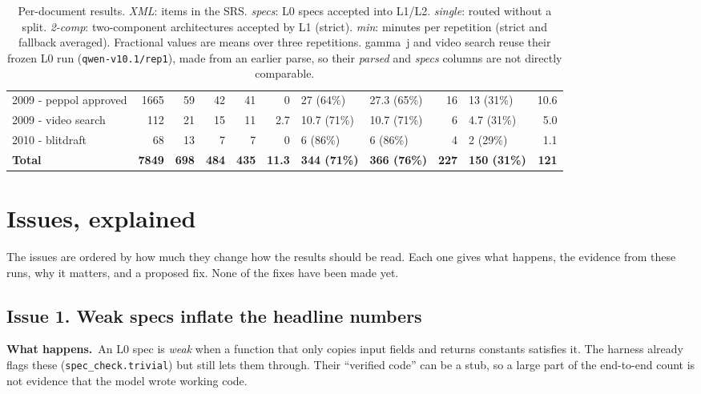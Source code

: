 \documentclass[10pt,a4paper]{article}
\newcommand{\code}[1]{\texttt{\small #1}}
\newcommand{\what}{\par\smallskip\textbf{What happens.}~}
\begin{document}
\begin{table}[h]
\begin{tabular}{@{}lrrrrrllrlr@{}}
2009 - peppol approved & 1665 & 59  & 42 & 41 & 0   & 27 (64\%)    & 27.3 (65\%)  & 16 & 13 (31\%)   & 10.6 \\
2009 - video search    & 112  & 21  & 15 & 11 & 2.7 & 10.7 (71\%)  & 10.7 (71\%)  & 6  & 4.7 (31\%)  & 5.0 \\
2010 - blitdraft       & 68   & 13  & 7  & 7  & 0   & 6 (86\%)     & 6 (86\%)     & 4  & 2 (29\%)    & 1.1 \\
\midrule
\rowcolor{white}
\textbf{Total} & \textbf{7849} & \textbf{698} & \textbf{484} & \textbf{435} & \textbf{11.3} & \textbf{344 (71\%)} &
  \textbf{366 (76\%)} & \textbf{227} & \textbf{150 (31\%)} & \textbf{121} \\
\bottomrule
\end{tabular}
\caption{Per-document results. \emph{XML}: items in the SRS. \emph{specs}: L0 specs accepted into L1/L2. \emph{single}:
routed without a split. \emph{2-comp}: two-component architectures accepted by L1 (strict). \emph{min}: minutes per
repetition (strict and fallback averaged). Fractional values are means over three repetitions. gamma~j and video search reuse
their frozen L0 run (\code{qwen-v10.1/rep1}), made from an earlier parse, so their \emph{parsed} and \emph{specs} columns are
not directly comparable.}
\label{tab:perdoc}
\end{table}

\clearpage
\section{Issues, explained}
The issues are ordered by how much they change how the results should be read. Each one gives what happens, the evidence
from these runs, why it matters, and a proposed fix. None of the fixes have been made yet.

\subsection*{Issue 1. Weak specs inflate the headline numbers}
\what An L0 spec is \emph{weak} when a function that only copies input fields and returns constants satisfies it. The harness
already flags these (\code{spec\_check.trivial}) but still lets them through. Their ``verified code'' can be a stub, so a large
part of the end-to-end count is not evidence that the model wrote working code.
\end{document}
